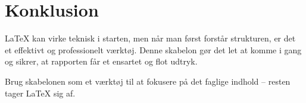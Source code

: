 \newpage

\section{Konklusion}

LaTeX kan virke teknisk i starten, men når man først forstår strukturen, er det et effektivt og professionelt værktøj.
Denne skabelon gør det let at komme i gang og sikrer, at rapporten får et ensartet og flot udtryk.

Brug skabelonen som et værktøj til at fokusere på det faglige indhold – resten tager LaTeX sig af.
